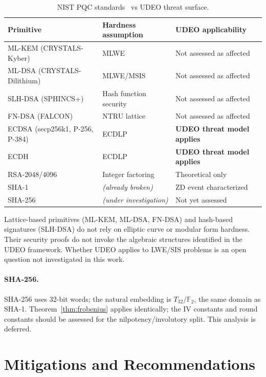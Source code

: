 \documentclass[runningheads]{llncs}
\theoremstyle{plain}
\theoremstyle{definition}
\newcommand{\GFtwo}{\mathbb{F}_2}
\begin{document}
\begin{table}[h]
\centering
\caption{NIST PQC standards~\cite{NIST-PQC} vs UDEO threat surface.}
\label{tab:pqc}
\begin{tabular}{lll}
\toprule
Primitive & Hardness assumption & UDEO applicability \\
\midrule
ML-KEM (CRYSTALS-Kyber) & MLWE & Not assessed as affected \\
ML-DSA (CRYSTALS-Dilithium) & MLWE/MSIS & Not assessed as affected \\
SLH-DSA (SPHINCS+) & Hash function security & Not assessed as affected \\
FN-DSA (FALCON) & NTRU lattice & Not assessed as affected \\
\midrule
ECDSA (secp256k1, P-256, P-384) & ECDLP & \textbf{UDEO threat model applies} \\
ECDH & ECDLP & \textbf{UDEO threat model applies} \\
RSA-2048/4096 & Integer factoring & Theoretical only \\
SHA-1 & \emph{(already broken)} & ZD event characterized \\
SHA-256 & \emph{(under investigation)} & Not yet assessed \\
\bottomrule
\end{tabular}
\end{table}

Lattice-based primitives (ML-KEM, ML-DSA, FN-DSA) and hash-based signatures
(SLH-DSA) do not rely on elliptic curve or modular form hardness. Their
security proofs do not invoke the algebraic structures identified in the
UDEO framework. Whether UDEO applies to LWE/SIS problems is an open question
not investigated in this work.

\paragraph{SHA-256.} SHA-256 uses 32-bit words; the natural embedding is
$T_{32}/\GFtwo$, the same domain as SHA-1. Theorem~\ref{thm:frobenius}
applies identically; the IV constants and round constants should be assessed
for the nilpotency/involutory split. This analysis is deferred.


\section{Mitigations and Recommendations}
\label{sec:mitigations}
\end{document}
